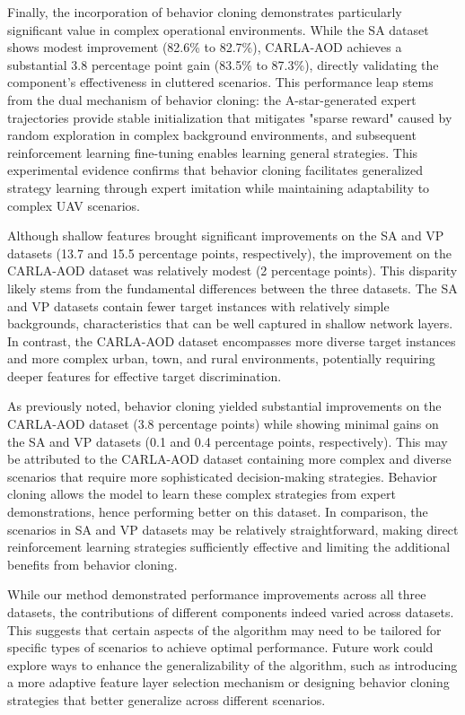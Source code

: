 \documentclass[lettersize,journal]{IEEEtran}
\begin{document}
Finally, the incorporation of behavior cloning demonstrates particularly significant value in complex operational environments. While the SA dataset shows modest improvement (82.6\% to 82.7\%), CARLA-AOD achieves a substantial 3.8 percentage point gain (83.5\% to 87.3\%), directly validating the component's effectiveness in cluttered scenarios. This performance leap stems from the dual mechanism of behavior cloning: the A-star-generated expert trajectories provide stable initialization that mitigates "sparse reward" caused by random exploration in complex background environments, and subsequent reinforcement learning fine-tuning enables learning general strategies. This experimental evidence confirms that behavior cloning facilitates generalized strategy learning through expert imitation while maintaining adaptability to complex UAV scenarios.

Although shallow features brought significant improvements on the SA and VP datasets (13.7 and 15.5 percentage points, respectively), the improvement on the CARLA-AOD dataset was relatively modest (2 percentage points).   This disparity likely stems from the fundamental differences between the three datasets.   The SA and VP datasets contain fewer target instances with relatively simple backgrounds, characteristics that can be well captured in shallow network layers.   In contrast, the CARLA-AOD dataset encompasses more diverse target instances and more complex urban, town, and rural environments, potentially requiring deeper features for effective target discrimination.

As previously noted, behavior cloning yielded substantial improvements on the CARLA-AOD dataset (3.8 percentage points) while showing minimal gains on the SA and VP datasets (0.1 and 0.4 percentage points, respectively).   This may be attributed to the CARLA-AOD dataset containing more complex and diverse scenarios that require more sophisticated decision-making strategies.   Behavior cloning allows the model to learn these complex strategies from expert demonstrations, hence performing better on this dataset.   In comparison, the scenarios in SA and VP datasets may be relatively straightforward, making direct reinforcement learning strategies sufficiently effective and limiting the additional benefits from behavior cloning.

While our method demonstrated performance improvements across all three datasets, the contributions of different components indeed varied across datasets.   This suggests that certain aspects of the algorithm may need to be tailored for specific types of scenarios to achieve optimal performance.   Future work could explore ways to enhance the generalizability of the algorithm, such as introducing a more adaptive feature layer selection mechanism or designing behavior cloning strategies that better generalize across different scenarios.
\end{document}
